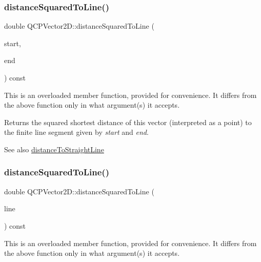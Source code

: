 \subsubsection{\texorpdfstring{distance\+Squared\+To\+Line()}{distanceSquaredToLine()}\hspace{0.1cm}{\footnotesize\ttfamily [1/2]}}
{\footnotesize\ttfamily double Q\+C\+P\+Vector2\+D\+::distance\+Squared\+To\+Line (\begin{DoxyParamCaption}\item[{const \hyperlink{class_q_c_p_vector2_d}{Q\+C\+P\+Vector2D} \&}]{start,  }\item[{const \hyperlink{class_q_c_p_vector2_d}{Q\+C\+P\+Vector2D} \&}]{end }\end{DoxyParamCaption}) const}

This is an overloaded member function, provided for convenience. It differs from the above function only in what argument(s) it accepts.

Returns the squared shortest distance of this vector (interpreted as a point) to the finite line segment given by {\itshape start} and {\itshape end}.

\begin{DoxySeeAlso}{See also}
\hyperlink{class_q_c_p_vector2_d_ae240b845c3744e43a5d0aa7b2bb66c19}{distance\+To\+Straight\+Line} 
\end{DoxySeeAlso}
\mbox{\label{class_q_c_p_vector2_d_a0c44ca97d46ee04feec32c1c57e70831}} 
\subsubsection{\texorpdfstring{distance\+Squared\+To\+Line()}{distanceSquaredToLine()}\hspace{0.1cm}{\footnotesize\ttfamily [2/2]}}
{\footnotesize\ttfamily double Q\+C\+P\+Vector2\+D\+::distance\+Squared\+To\+Line (\begin{DoxyParamCaption}\item[{const Q\+LineF \&}]{line }\end{DoxyParamCaption}) const}

This is an overloaded member function, provided for convenience. It differs from the above function only in what argument(s) it accepts.

